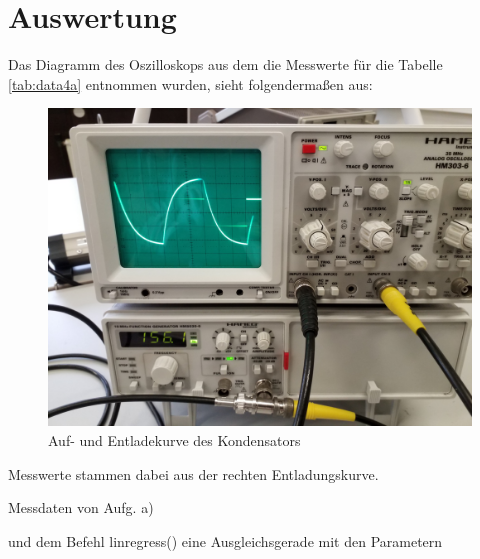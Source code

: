
\newpage
\section{Auswertung}\justifying

  
  Das Diagramm des Oszilloskops aus dem die Messwerte für die Tabelle \ref{tab:data4a} entnommen 
  wurden, sieht folgendermaßen aus:
  \begin{figure}[H]
    \includegraphics[width=\textwidth]{images/4a.jpg}
    \centering
    \caption{Auf- und Entladekurve des Kondensators}
    \label{fig:4ajpg}
  \end{figure}
   Messwerte stammen dabei aus der rechten Entladungskurve.
  \begin{table}[H]
        \centering
        \caption{Messdaten von Aufg. a)}
         
        \label{tab:data4a}
  \end{table}
  \newpage
   \cite{scipy} und dem Befehl linregress() eine
  Ausgleichsgerade mit den Parametern

